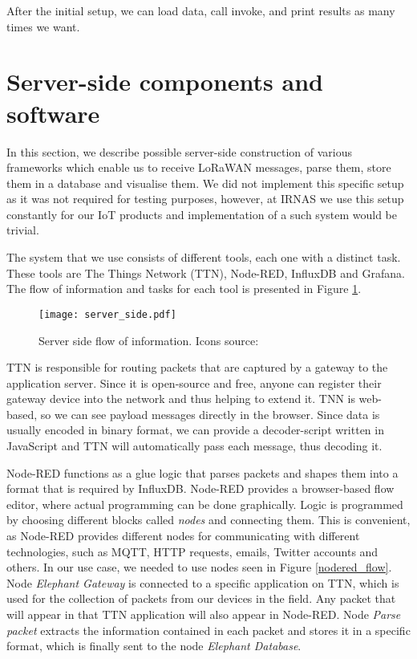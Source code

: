 After the initial setup, we can load data, call invoke, and print results as many times we want.


\section{ Server-side components and software}

In this section, we describe possible server-side construction of various frameworks which enable us to receive LoRaWAN messages, parse them, store them in a database and visualise them.
We did not implement this specific setup as it was not required for testing purposes, however, at IRNAS we use this setup constantly for our IoT products and implementation of a such system would be trivial.

The system that we use consists of different tools, each one with a distinct task.
These tools are The Things Network (TTN), Node-RED, InfluxDB and Grafana.
The flow of information and tasks for each tool is presented in Figure \ref{server_side}.

\begin{figure}[ht]
    \centering
    \texttt{[image: server\_side.pdf]} 
    \caption[Server side flow of information.]{Server side flow of information. Icons source:\cite{icons}}
    \label{server_side}
\end{figure}

TTN is responsible for routing packets that are captured by a gateway to the application server.
Since it is open-source and free, anyone can register their gateway device into the network and thus helping to extend it.
TNN is web-based, so we can see payload messages directly in the browser.
Since data is usually encoded in binary format, we can provide a decoder-script written in JavaScript and TTN will automatically pass each message, thus decoding it.

Node-RED functions as a glue logic that parses packets and shapes them into a format that is required by InfluxDB.
Node-RED provides a browser-based flow editor, where actual programming can be done graphically.
Logic is programmed by choosing different blocks called \textit{nodes} and connecting them.
This is convenient, as Node-RED provides different nodes for communicating with different technologies, such as MQTT, HTTP requests, emails, Twitter accounts and others.
In our use case, we needed to use nodes seen in Figure \ref{nodered_flow}.
Node \textit{Elephant Gateway} is connected to a specific application on TTN, which is used for the collection of packets from our devices in the field.
Any packet that will appear in that TTN application will also appear in Node-RED.
Node \textit{Parse packet} extracts the information contained in each packet and stores it in a specific format, which is finally sent to the node \textit{Elephant Database}.

